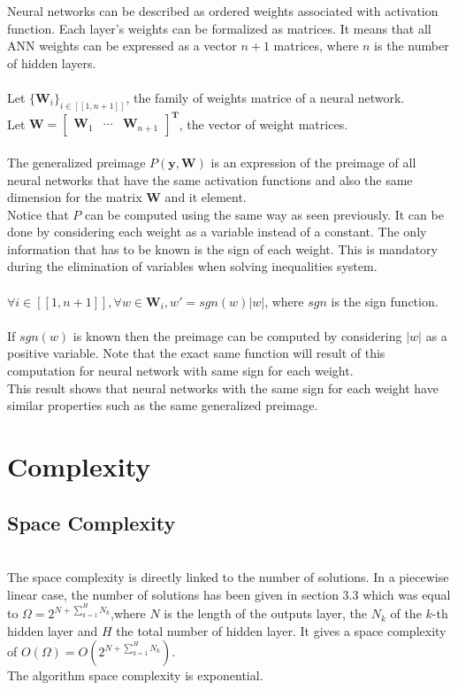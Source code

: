 \documentclass{article}
\begin{document}
Neural networks can be described as ordered weights associated with activation function. Each layer's weights can be formalized as 
matrices. It means that all ANN weights can be expressed as a vector $n+1$ matrices, 
where $n$ is the number of hidden layers.\\\\
Let $\{\textbf{W}_{i}\}_{i \in [\![1,n+1]\!]}$, the family of weights matrice of a neural network.\\
Let $\textbf{W}=
\begin{bmatrix}
    \textbf{W}_{1} & \cdots & \textbf{W}_{n+1} 
\end{bmatrix}^{\textbf{T}}$, the vector of weight matrices.\\\\
The generalized preimage $P(\textbf{y},\textbf{W})$ is an expression of the preimage of all neural networks that have the same activation functions
and also the same dimension for the matrix $\textbf{W}$ and it element.\\
Notice that $P$ can be computed using the same way as seen previously. It can be done by considering each weight as a variable instead of a constant.
The only information that has to be known is the sign of each weight. This is mandatory during the elimination
of variables when solving inequalities system.\\\\
$\forall i \in [\![1,n+1]\!], \forall w \in \textbf{W}_{i} , w' = sgn(w)\lvert w\rvert$, where $sgn$ is the sign function. \\\\
If $sgn(w)$ is known then the preimage can be computed by considering $\lvert w\rvert$ as a positive variable.
Note that the exact same function will result of this computation for neural network with same sign for each weight.\\
This result shows that neural networks with the same sign for each weight have similar properties such as the same generalized preimage.

\newpage
\section{Complexity}
\subsection{Space Complexity}\
\\
The space complexity is directly linked to the number of solutions. In a piecewise linear case, the number of solutions has been given in
section $3.3$ which was equal to $\Omega=2^{N+\sum_{k=1}^{H} N_{k}}$,where $N$ is the length of the outputs layer, the $N_{k}$ of the $k$-th hidden layer and
$H$ the total number of hidden layer.
It gives a space complexity of $O(\Omega)=O(2^{N+\sum_{k=1}^{H} N_{k}})$.\\
The algorithm space complexity is exponential.
\end{document}
